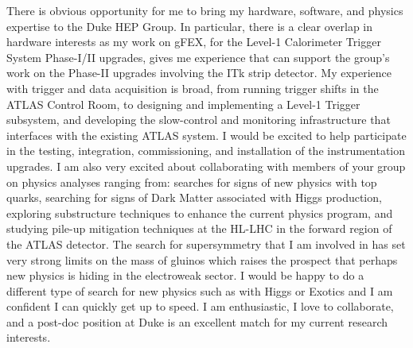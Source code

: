 

There is obvious opportunity for me to bring my hardware, software, and physics expertise to the Duke HEP Group. In particular, there is a clear overlap in hardware interests as my work on gFEX, for the Level-1 Calorimeter Trigger System Phase-I/II upgrades, gives me experience that can support the group's work on the Phase-II upgrades involving the ITk strip detector. My experience with trigger and data acquisition is broad, from running trigger shifts in the ATLAS Control Room, to designing and implementing a Level-1 Trigger subsystem, and developing the slow-control and monitoring infrastructure that interfaces with the existing ATLAS system. I would be excited to help participate in the testing, integration, commissioning, and installation of the instrumentation upgrades. I am also very excited about collaborating with members of your group on physics analyses ranging from: searches for signs of new physics with top quarks, searching for signs of Dark Matter associated with Higgs production, exploring substructure techniques to enhance the current physics program, and studying pile-up mitigation techniques at the HL-LHC in the forward region of the ATLAS detector. The search for supersymmetry that I am involved in has set very strong limits on the mass of gluinos which raises the prospect that perhaps new physics is hiding in the electroweak sector. I would be happy to do a different type of search for new physics such as with Higgs or Exotics and I am confident I can quickly get up to speed. I am enthusiastic, I love to collaborate, and a post-doc position at Duke is an excellent match for my current research interests.


